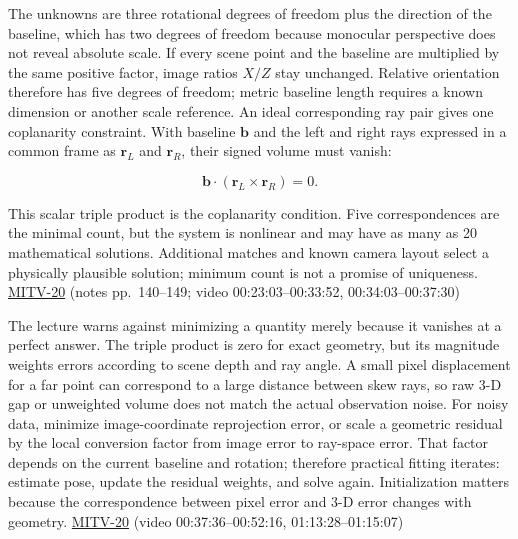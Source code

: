 The unknowns are three rotational degrees of freedom plus the direction of the baseline, which has two degrees of freedom because monocular perspective does not reveal absolute scale. If every scene point and the baseline are multiplied by the same positive factor, image ratios \(X/Z\) stay unchanged. Relative orientation therefore has five degrees of freedom; metric baseline length requires a known dimension or another scale reference. An ideal corresponding ray pair gives one coplanarity constraint. With baseline \(\mathbf{b}\) and the left and right rays expressed in a common frame as \(\mathbf{r}_L\) and \(\mathbf{r}_R\), their signed volume must vanish:

\[
\mathbf{b}\cdot(\mathbf{r}_L\times\mathbf{r}_R)=0.
\]

This scalar triple product is the coplanarity condition. Five correspondences are the minimal count, but the system is nonlinear and may have as many as 20 mathematical solutions. Additional matches and known camera layout select a physically plausible solution; minimum count is not a promise of uniqueness. \hyperref[04-visual-computing-ii-ch036-mitv-20---space-of-rotations-regular-tessellations-critical-surfaces-binocular-stereo]{MITV-20} (notes pp.~140--149; video 00:23:03--00:33:52, 00:34:03--00:37:30)

The lecture warns against minimizing a quantity merely because it vanishes at a perfect answer. The triple product is zero for exact geometry, but its magnitude weights errors according to scene depth and ray angle. A small pixel displacement for a far point can correspond to a large distance between skew rays, so raw 3-D gap or unweighted volume does not match the actual observation noise. For noisy data, minimize image-coordinate reprojection error, or scale a geometric residual by the local conversion factor from image error to ray-space error. That factor depends on the current baseline and rotation; therefore practical fitting iterates: estimate pose, update the residual weights, and solve again. Initialization matters because the correspondence between pixel error and 3-D error changes with geometry. \hyperref[04-visual-computing-ii-ch036-mitv-20---space-of-rotations-regular-tessellations-critical-surfaces-binocular-stereo]{MITV-20} (video 00:37:36--00:52:16, 01:13:28--01:15:07)

